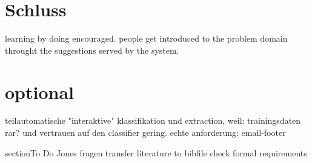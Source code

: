 \chapter{Schluss}
learning by doing encouraged. people get introduced to the problem domain throught the suggestions served by the system.


\chapter{optional}
teilautomatische "interaktive" klassifikation und extraction, weil: trainingsdaten rar? und vertrauen auf den classifier gering.
echte anforderung: email-footer




section{To Do}
Jones fragen
transfer literature to bibfile
check formal requirements
